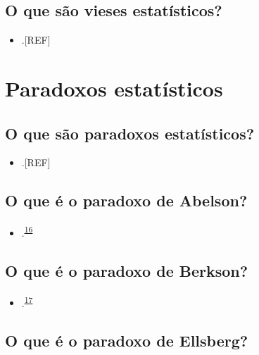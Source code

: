 \documentclass[
  a4paper,
]{book}
\providecommand{\tightlist}{%
  \setlength{\itemsep}{0pt}\setlength{\parskip}{0pt}}
\begin{document}
\hypertarget{o-que-suxe3o-vieses-estatuxedsticos}{%
\subsection{O que são vieses estatísticos?}\label{o-que-suxe3o-vieses-estatuxedsticos}}

\begin{itemize}
\tightlist
\item
  .{[}REF{]}
\end{itemize}

\hypertarget{paradoxos}{%
\section{Paradoxos estatísticos}\label{paradoxos}}

\hypertarget{o-que-suxe3o-paradoxos-estatuxedsticos}{%
\subsection{O que são paradoxos estatísticos?}\label{o-que-suxe3o-paradoxos-estatuxedsticos}}

\begin{itemize}
\tightlist
\item
  .{[}REF{]}
\end{itemize}

\hypertarget{abelson}{%
\subsection{O que é o paradoxo de Abelson?}\label{abelson}}

\begin{itemize}
\tightlist
\item
  .\textsuperscript{\protect\hyperlink{ref-abelson1985}{16}}
\end{itemize}

\hypertarget{Berkson}{%
\subsection{O que é o paradoxo de Berkson?}\label{Berkson}}

\begin{itemize}
\tightlist
\item
  .\textsuperscript{\protect\hyperlink{ref-berkson1946}{17}}
\end{itemize}

\hypertarget{ellsberg}{%
\subsection{O que é o paradoxo de Ellsberg?}\label{ellsberg}}
\end{document}
